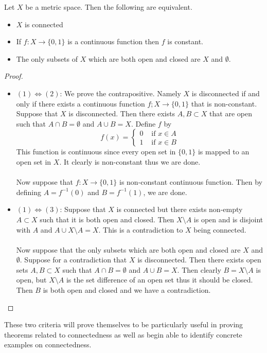 \documentclass[a4paper]{article}
\begin{document}
\begin{prp}{}{} Let $X$ be a metric space. Then the following are equivalent. 
\begin{itemize}
\item $X$ is connected
\item If $f:X\to\{0,1\}$ is a continuous function then $f$ is constant. 
\item The only subsets of $X$ which are both open and closed are $X$ and $\emptyset$. 
\end{itemize} \tcbline
\begin{proof}~\\
\begin{itemize}
\item $(1)\iff(2)$: We prove the contrapositive. Namely $X$ is disconnected if and only if there exists a continuous function $f;X\to\{0,1\}$ that is non-constant. Suppose that $X$ is disconnected. Then there exists $A,B\subset X$ that are open such that $A\cap B=\emptyset$ and $A\cup B=X$. Define $f$ by $$f(x)=\begin{cases}
0 & \text{ if }x\in A\\
1 & \text{ if }x\in B
\end{cases}$$
This function is continuous since every open set in $\{0,1\}$ is mapped to an open set in $X$. It clearly is non-constant thus we are done. \\~\\
Now suppose that $f:X\to\{0,1\}$ is non-constant continuous function. Then by defining $A=f^{-1}(0)$ and $B=f^{-1}(1)$, we are done. 
\item $(1)\iff(3)$: Suppose that $X$ is connected but there exists non-empty $A\subset X$ such that it is both open and closed. Then $X\setminus A$ is open and is disjoint with $A$ and $A\cup X\setminus A=X$. This is a contradiction to $X$ being connected. \\~\\
Now suppose that the only subsets which are both open and closed are $X$ and $\emptyset$. Suppose for a contradiction that $X$ is disconnected. Then there exists open sets $A,B\subset X$ such that $A\cap B=\emptyset$ and $A\cup B=X$. Then clearly $B=X\setminus A$ is open, but $X\setminus A$ is the set difference of an open set thus it should be closed. Then $B$ is both open and closed and we have a contradiction. 
\end{itemize}
\end{proof}
\end{prp}

These two criteria will prove themselves to be particularly useful in proving theorems related to connectedness as well as begin able to identify concrete examples on connectedness. 
\end{document}
